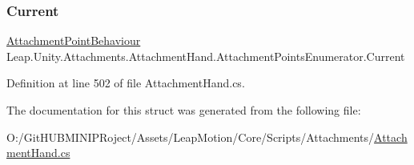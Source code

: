 \subsubsection{\texorpdfstring{Current}{Current}}
{\footnotesize\ttfamily \mbox{\hyperlink{class_leap_1_1_unity_1_1_attachments_1_1_attachment_point_behaviour}{Attachment\+Point\+Behaviour}} Leap.\+Unity.\+Attachments.\+Attachment\+Hand.\+Attachment\+Points\+Enumerator.\+Current\hspace{0.3cm}{\ttfamily [get]}}



Definition at line 502 of file Attachment\+Hand.\+cs.



The documentation for this struct was generated from the following file\+:\begin{DoxyCompactItemize}
\item 
O\+:/\+Git\+H\+U\+B\+M\+I\+N\+I\+P\+Roject/\+Assets/\+Leap\+Motion/\+Core/\+Scripts/\+Attachments/\mbox{\hyperlink{_attachment_hand_8cs}{Attachment\+Hand.\+cs}}\end{DoxyCompactItemize}
